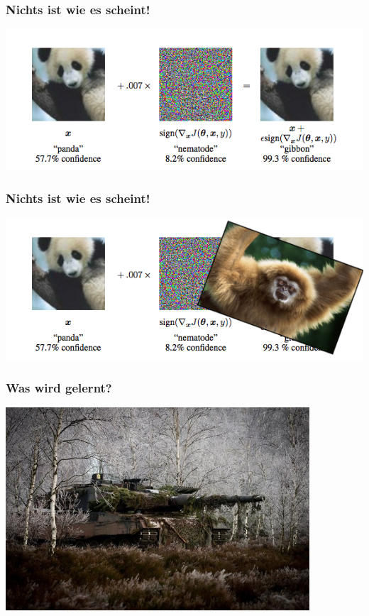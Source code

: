 \documentclass[aspectratio=43,x11names]{beamer}
\begin{document}
\begin{frame}
\frametitle{Nichts ist wie es scheint!}
\begin{center}
\includegraphics[width=\textwidth,keepaspectratio]{images/recog_panda.png} 
\end{center}
\end{frame}

\begin{frame}
\frametitle{Nichts ist wie es scheint!}
\begin{center}
\includegraphics[width=\textwidth, keepaspectratio]{images/recog_gibbon.png} 
\end{center}
\end{frame}

\begin{frame}
\frametitle{Was wird gelernt?}
\begin{center}
\includegraphics[width=0.85\textwidth]{images/tank} 
\end{center}
\end{frame}
\end{document}
